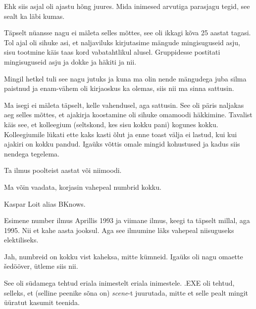 Ehk siis asjal oli ajastu hõng juures. Mida inimesed arvutiga parasjagu tegid, see  sealt ka läbi kumas. 


Täpselt nüansse nagu ei mäleta selles mõttes, see oli ikkagi kõva 25 aastat tagasi. Tol ajal oli sihuke asi, et naljaviluks kirjutasime mängude mingisuguseid asju, sisu tootmine käis taas kord vabatahtlikul alusel. Gruppidesse postitati mingisuguseid asju ja dokke ja häkiti ja nii. 


Mingil hetkel tuli see nagu jutuks ja kuna ma olin nende mängudega juba silma paistnud ja enam-vähem oli kirjaoskus ka olemas, siis nii ma sinna sattusin. 

Ma isegi ei mäleta täpselt, kelle vahendusel, aga sattusin. See oli päris naljakas aeg selles mõttes, et ajakirja koostamine oli sihuke omamoodi häkkimine. Tavalist käis see, et kolleegium (seltskond, kes sisu kokku pani) kogunes kokku. Kolleegiumile lükati ette kaks kasti õlut ja enne toast välja ei lastud, kui kui ajakiri on kokku pandud. Igaüks võttis omale mingid kohustused ja kadus siis nendega tegelema.


Ta ilmus poolteist aastat või niimoodi.


Ma võin vaadata, korjasin vahepeal numbrid kokku.


Kaspar Loit alias BKnows.

Esimene number ilmus Aprillis 1993 ja viimane ilmus, keegi ta täpselt millal, aga 1995. Nii et kahe aasta jooksul. Aga see ilmumine läks vahepeal niisuguseks elektiliseks.


Jah, numbreid on kokku vist kaheksa, mitte kümneid. Igaüks oli nagu omaette šedööver, ütleme siis nii.


See oli südamega tehtud eriala inimestelt eriala inimestele. .EXE oli tehtud, selleks, et (selline peenike sõna on) \emph{scene}-t juurutada, mitte et selle pealt mingit üüratut kasumit teenida. 

